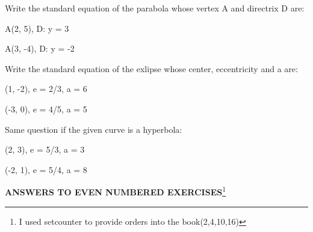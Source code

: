 \documentclass[11pt]{amsbook}
\begin{document}
\begin{hEnumerateArabic}
	\item Write the standard equation of the parabola whose vertex A and directrix D are:
		\begin{hEnumerateAlpha}
			\begin{multicols}{2}
				\item A(2, 5), \: D: y = 3
			\columnbreak
				\item A(3, -4), \: D: y = -2
			\end{multicols}
		\end{hEnumerateAlpha}
	\item Write the standard equation of the exlipse whose center, eccentricity and a are:
		\begin{hEnumerateAlpha}
			\begin{multicols}{2}
				\item (1, -2), \: e = 2/3, \: a = 6
			\columnbreak
				\item (-3, 0), \: e = 4/5, \: a = 5
			\end{multicols}	
		\end{hEnumerateAlpha}
	\item Same question if the given curve is a hyperbola:
		\begin{hEnumerateAlpha}
			\begin{multicols}{2}
				\item (2, 3), \: e = 5/3, \: a = 3
			\columnbreak
				\item (-2, 1), \: e = 5/4, \: a = 8\\  
			\end{multicols}
		\end{hEnumerateAlpha}
\end{hEnumerateArabic}

\centerline{\textbf{ANSWERS TO EVEN NUMBERED EXERCISES}\footnote{I used setcounter to provide orders into the book(2,4,10,16)}} 
\end{document}
